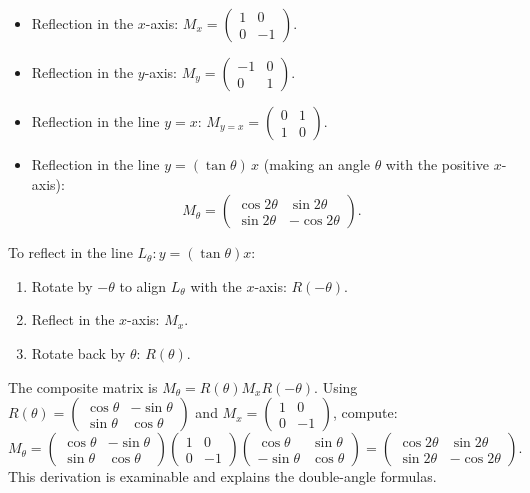 \documentclass[11pt]{article}
\begin{document}
\begin{itemize}
\item Reflection in the $x$-axis: $\displaystyle M_x = \begin{pmatrix} 1 & 0 \\ 0 & -1 \end{pmatrix}$.
\item Reflection in the $y$-axis: $\displaystyle M_y = \begin{pmatrix} -1 & 0 \\ 0 & 1 \end{pmatrix}$.
\item Reflection in the line $y = x$: $\displaystyle M_{y=x} = \begin{pmatrix} 0 & 1 \\ 1 & 0 \end{pmatrix}$.
\item Reflection in the line $y = (\tan\theta)\,x$ (making an angle $\theta$ with the positive $x$-axis):
\[
M_\theta = \begin{pmatrix} \cos 2\theta & \sin 2\theta \\ \sin 2\theta & -\cos 2\theta \end{pmatrix}.
\]
\end{itemize}

\begin{experience}
To reflect in the line $L_\theta : y = (\tan\theta)x$:
\begin{enumerate}
\item Rotate by $-\theta$ to align $L_\theta$ with the $x$-axis: $R(-\theta)$.
\item Reflect in the $x$-axis: $M_x$.
\item Rotate back by $\theta$: $R(\theta)$.
\end{enumerate}
The composite matrix is $M_\theta = R(\theta) M_x R(-\theta)$. Using
$R(\theta) = \begin{pmatrix} \cos\theta & -\sin\theta \\ \sin\theta & \cos\theta \end{pmatrix}$ and $M_x = \begin{pmatrix} 1 & 0 \\ 0 & -1 \end{pmatrix}$, compute:
\[
M_\theta = \begin{pmatrix} \cos\theta & -\sin\theta \\ \sin\theta & \cos\theta \end{pmatrix}
\begin{pmatrix} 1 & 0 \\ 0 & -1 \end{pmatrix}
\begin{pmatrix} \cos\theta & \sin\theta \\ -\sin\theta & \cos\theta \end{pmatrix}
= \begin{pmatrix} \cos 2\theta & \sin 2\theta \\ \sin 2\theta & -\cos 2\theta \end{pmatrix}.
\]
This derivation is examinable and explains the double-angle formulas.
\end{experience}
\end{document}
